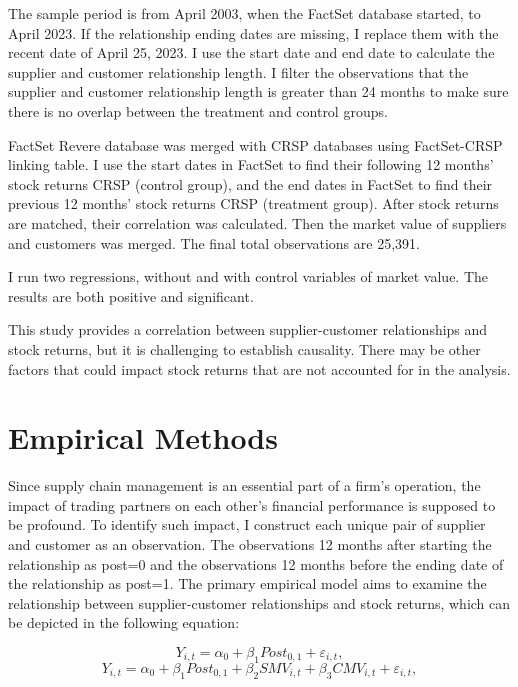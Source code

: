 \documentclass[12pt,english]{article}
\begin{document}
The sample period is from April 2003, when the FactSet database started, to
April 2023. If the relationship ending dates are missing, I replace them with the recent date of April 25, 2023. I use the start date and end date to calculate the supplier and customer relationship length. I filter the observations that the supplier and customer relationship length is greater than 24 months to make sure there is no overlap between the treatment and control groups. 

FactSet Revere database was merged with CRSP databases using FactSet-CRSP linking table. I use the start dates in FactSet to find their following 12 months' stock returns CRSP (control group), and the end dates in FactSet to find their previous 12 months' stock returns CRSP (treatment group). After stock returns are matched, their correlation was calculated. Then the market value of suppliers and customers was merged. The final total observations are 25,391.

I run two regressions, without and with control variables of market value. The results are both positive and significant.

This study provides a correlation between supplier-customer relationships and stock returns, but it is challenging to establish causality. There may be other factors that could impact stock returns that are not accounted for in the analysis.

\section{Empirical Methods}\label{sec:methods}
Since supply chain management is an essential part of a firm's operation, the impact of trading partners on each other's financial performance is supposed to be profound. To identify such impact, I construct each unique pair of supplier and customer as an observation. The observations 12 months after starting the relationship as post=0 and the observations 12 months before the ending date of the relationship as post=1. 
The primary empirical model aims to examine the relationship between supplier-customer relationships and stock returns, which can be depicted in the following equation:

\begin{equation}
\label{eq:1}
Y_{i,t}=\alpha_{0} + \beta_{1}Post_{0,1} + \varepsilon_{i,t},
\end{equation}
\begin{equation}
\label{eq:2}
Y_{i,t}=\alpha_{0} + \beta_{1}Post_{0,1} +\beta_{2}SMV_{i,t}+\beta_{3}CMV_{i,t}+ \varepsilon_{i,t},
\end{equation}
\end{document}
